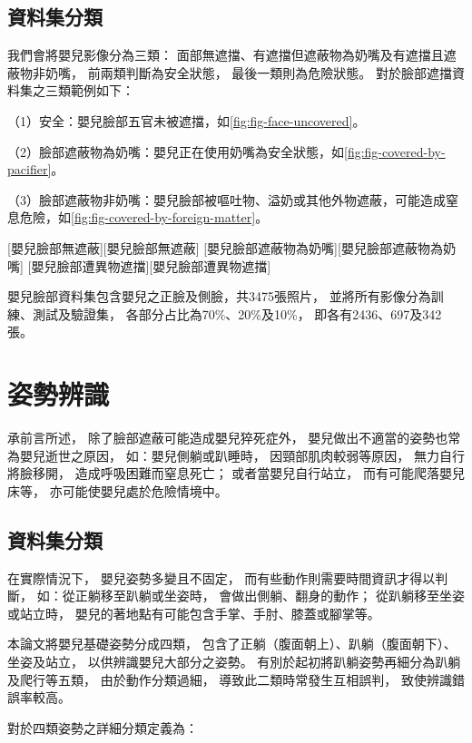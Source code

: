 \documentclass[class=NCU_thesis, crop=false]{standalone}
\begin{document}
\subsection{資料集分類}
我們會將嬰兒影像分為三類：
面部無遮擋、有遮擋但遮蔽物為奶嘴及有遮擋且遮蔽物非奶嘴，
前兩類判斷為安全狀態，
最後一類則為危險狀態。
對於臉部遮擋資料集之三類範例如下：

（1）安全：嬰兒臉部五官未被遮擋，如\cref{fig:fig-face-uncovered}。

（2）臉部遮蔽物為奶嘴：嬰兒正在使用奶嘴為安全狀態，如\cref{fig:fig-covered-by-pacifier}。

（3）臉部遮蔽物非奶嘴：嬰兒臉部被嘔吐物、溢奶或其他外物遮蔽，可能造成窒息危險，如\cref{fig:fig-covered-by-foreign-matter}。

[嬰兒臉部無遮蔽][嬰兒臉部無遮蔽]
[嬰兒臉部遮蔽物為奶嘴][嬰兒臉部遮蔽物為奶嘴]
[嬰兒臉部遭異物遮擋][嬰兒臉部遭異物遮擋]

嬰兒臉部資料集包含嬰兒之正臉及側臉，共3475張照片，
並將所有影像分為訓練、測試及驗證集，
各部分占比為70\%、20\%及10\%，
即各有2436、697及342張。

\section{姿勢辨識}
承前言所述，
除了臉部遮蔽可能造成嬰兒猝死症外，
嬰兒做出不適當的姿勢也常為嬰兒逝世之原因，
如：嬰兒側躺或趴睡時，
因頸部肌肉較弱等原因，
無力自行將臉移開，
造成呼吸困難而窒息死亡；
或者當嬰兒自行站立，
而有可能爬落嬰兒床等，
亦可能使嬰兒處於危險情境中。

\subsection{資料集分類}
在實際情況下，
嬰兒姿勢多變且不固定，
而有些動作則需要時間資訊才得以判斷，
如：從正躺移至趴躺或坐姿時，
會做出側躺、翻身的動作；
從趴躺移至坐姿或站立時，
嬰兒的著地點有可能包含手掌、手肘、膝蓋或腳掌等。

本論文將嬰兒基礎姿勢分成四類，
包含了正躺（腹面朝上）、趴躺（腹面朝下）、坐姿及站立，
以供辨識嬰兒大部分之姿勢。
有別於起初將趴躺姿勢再細分為趴躺及爬行等五類，
由於動作分類過細，
導致此二類時常發生互相誤判，
致使辨識錯誤率較高。

對於四類姿勢之詳細分類定義為：
\end{document}
